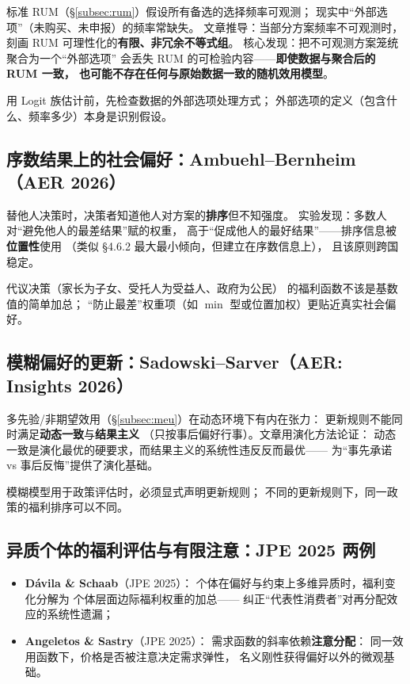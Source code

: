 标准 RUM（§\ref{subsec:rum}）假设所有备选的选择频率可观测；
现实中“外部选项”（未购买、未申报）的频率常缺失。
文章推导：当部分方案频率不可观测时，
刻画 RUM 可理性化的\textbf{有限、非冗余不等式组}。
核心发现：把不可观测方案笼统聚合为一个“外部选项”
会丢失 RUM 的可检验内容——\textbf{即使数据与聚合后的 RUM 一致，
也可能不存在任何与原始数据一致的随机效用模型}。

用 Logit 族估计前，先检查数据的外部选项处理方式；
外部选项的定义（包含什么、频率多少）本身是识别假设。

\subsection{序数结果上的社会偏好：Ambuehl--Bernheim（AER 2026）}

替他人决策时，决策者知道他人对方案的\textbf{排序}但不知强度。
实验发现：多数人对“避免他人的最差结果”赋的权重，
高于“促成他人的最好结果”——排序信息被\textbf{位置性}使用
（类似 §4.6.2 最大最小倾向，但建立在序数信息上），
且该原则跨国稳定。

代议决策（家长为子女、受托人为受益人、政府为公民）
的福利函数不该是基数值的简单加总；
“防止最差”权重项（如 $\min$ 型或位置加权）更贴近真实社会偏好。

\subsection{模糊偏好的更新：Sadowski--Sarver（AER: Insights 2026）}

多先验/非期望效用（§\ref{subsec:meu}）在动态环境下有内在张力：
更新规则不能同时满足\textbf{动态一致}与\textbf{结果主义}
（只按事后偏好行事）。文章用演化方法论证：
动态一致是演化最优的硬要求，而结果主义的系统性违反反而最优——
为“事先承诺 vs 事后反悔”提供了演化基础。

模糊模型用于政策评估时，必须显式声明更新规则；
不同的更新规则下，同一政策的福利排序可以不同。

\subsection{异质个体的福利评估与有限注意：JPE 2025 两例}

\begin{itemize}
  \item \textbf{D\'avila \& Schaab}（JPE 2025）：
        个体在偏好与约束上多维异质时，福利变化分解为
        个体层面边际福利权重的加总——
        纠正“代表性消费者”对再分配效应的系统性遗漏；
  \item \textbf{Angeletos \& Sastry}（JPE 2025）：
        需求函数的斜率依赖\textbf{注意分配}：
        同一效用函数下，价格是否被注意决定需求弹性，
        名义刚性获得偏好以外的微观基础。
\end{itemize}

